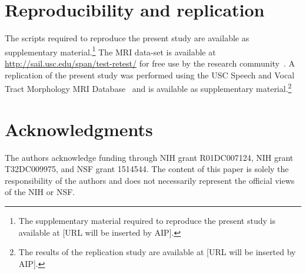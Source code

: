 \documentclass[preprint]{JASAnew}\usepackage[]{graphicx}\usepackage[]{color}
\begin{document}
\section{Reproducibility and replication}

The scripts required to reproduce the present study are available as supplementary material.\footnote{The supplementary material required to reproduce the present study is available at [URL will be inserted by AIP].}
%
The MRI data-set is available at \url{http://sail.usc.edu/span/test-retest/} for free use by the research community~\citep[see][]{toger2017test}.
%
A replication of the present study was performed using the USC Speech and Vocal Tract Morphology MRI Database~\citep{sorensen2017database} and is available as supplementary material.\footnote{The results of the replication study are available at [URL will be inserted by AIP].}

\section{Acknowledgments} 

The authors acknowledge funding through NIH grant R01DC007124, NIH grant T32DC009975, and NSF grant 1514544. The content of this paper is solely the responsibility of the authors and does not necessarily represent the official views of the NIH or NSF.


\end{document}
